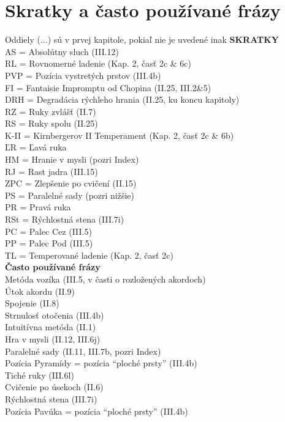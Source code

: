 \newpage
\section*{Skratky a často používané frázy}
Oddiely (...) sú v prvej kapitole, pokiaľ nie je uvedené inak
\vspace*{2em}
\newline
\noindent\textbf{SKRATKY}\\
AS = Absolútny sluch (III.12)\\
RL = Rovnomerné ladenie (Kap. 2, časť 2c \& 6c)\\
PVP = Pozícia vystretých prstov (III.4b)\\
FI = Fantaisie Impromptu od Chopina (II.25, III.2\&5)\\
DRH = Degradácia rýchleho hrania (II.25, ku koncu kapitoly)\\
RZ = Ruky zvlášť (II.7)\\
RS = Ruky spolu (II.25)\\
K-II = Kirnbergerov II Temperament (Kap. 2, časť 2c \& 6b)\\
ĽR = Ľavá ruka\\
HM = Hranie v mysli (pozri Index)\\
RJ = Rast jadra (III.15)\\
ZPC = Zlepšenie po cvičení (II.15)\\
PS = Paralelné sady (pozri nižšie)\\
PR = Pravá ruka\\
RSt = Rýchlostná stena (III.7i)\\
PC = Palec Cez (III.5)\\
PP = Palec Pod (III.5)\\
TL = Temperované ladenie (Kap. 2, časť 2c)
\vspace*{3em}\\
\noindent\textbf{Často používané frázy}\\
Metóda vozíka (III.5, v časti o rozložených akordoch)\\
Útok akordu (II.9)\\
Spojenie (II.8)\\
Strnulosť otočenia (III.4b)\\
Intuitívna metóda (II.1)\\
Hra v mysli (II.12, III.6j)\\
Paralelné sady (II.11, III.7b, pozri Index)\\
Pozícia Pyramídy = pozícia “ploché prsty” (III.4b)\\
Tiché ruky (III.6l)\\
Cvičenie po úsekoch (II.6)\\
Rýchlostná stena (III.7i)\\
Pozícia Pavúka = pozícia “ploché prsty” (III.4b)
\newpage

